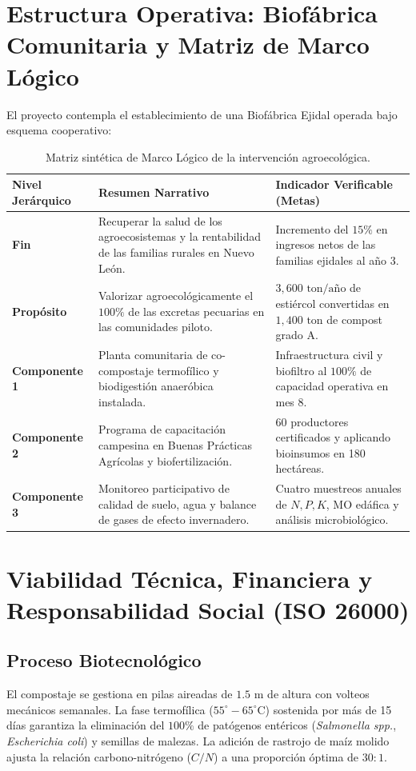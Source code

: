 \section{Estructura Operativa: Biofábrica Comunitaria y Matriz de Marco Lógico}
El proyecto contempla el establecimiento de una Biofábrica Ejidal operada bajo esquema cooperativo:
\begin{table}[h!]
    \centering
    \small
    \begin{tabularx}{\textwidth}{lYY}
        \toprule
        \textbf{Nivel Jerárquico} & \textbf{Resumen Narrativo} & \textbf{Indicador Verificable (Metas)} \\
        \midrule
        \textbf{Fin} & Recuperar la salud de los agroecosistemas y la rentabilidad de las familias rurales en Nuevo León. & Incremento del $15\%$ en ingresos netos de las familias ejidales al año 3. \\
        \textbf{Propósito} & Valorizar agroecológicamente el $100\%$ de las excretas pecuarias en las comunidades piloto. & $3,600\text{ ton/año}$ de estiércol convertidas en $1,400\text{ ton}$ de compost grado A. \\
        \textbf{Componente 1} & Planta comunitaria de co-compostaje termofílico y biodigestión anaeróbica instalada. & Infraestructura civil y biofiltro al $100\%$ de capacidad operativa en mes 8. \\
        \textbf{Componente 2} & Programa de capacitación campesina en Buenas Prácticas Agrícolas y biofertilización. & 60 productores certificados y aplicando bioinsumos en 180 hectáreas. \\
        \textbf{Componente 3} & Monitoreo participativo de calidad de suelo, agua y balance de gases de efecto invernadero. & Cuatro muestreos anuales de $N, P, K$, MO edáfica y análisis microbiológico. \\
        \bottomrule
    \end{tabularx}
    \caption{Matriz sintética de Marco Lógico de la intervención agroecológica.}
\end{table}

\section{Viabilidad Técnica, Financiera y Responsabilidad Social (ISO 26000)}
\subsection{Proceso Biotecnológico}
El compostaje se gestiona en pilas aireadas de $1.5\text{ m}$ de altura con volteos mecánicos semanales. La fase termofílica ($55^\circ - 65^\circ\text{C}$) sostenida por más de 15 días garantiza la eliminación del $100\%$ de patógenos entéricos (\textit{Salmonella spp.}, \textit{Escherichia coli}) y semillas de malezas. La adición de rastrojo de maíz molido ajusta la relación carbono-nitrógeno ($C/N$) a una proporción óptima de $30:1$.

